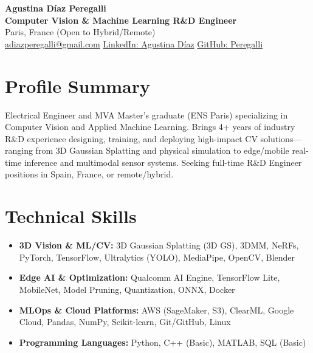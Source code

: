 \documentclass[10pt, a4paper]{article}
\begin{document}
\begin{center}
    {\LARGE \textbf{Agustina Díaz Peregalli}} \\ \vspace{2pt}
    {\large \textbf{Computer Vision \& Machine Learning R\&D Engineer}} \\ \vspace{2pt}
    Paris, France \textbar{} (Open to Hybrid/Remote) \\ \vspace{2pt}
    \href{mailto:adiazperegalli@gmail.com}{adiazperegalli@gmail.com} \textbar{} 
    \href{https://www.linkedin.com/in/agustina-diaz-peregalli/}{LinkedIn: Agustina Díaz} \textbar{} 
    \href{https://github.com/Peregalli}{GitHub: Peregalli}
\end{center}

\section{Profile Summary}
Electrical Engineer and MVA Master's graduate (ENS Paris) specializing in Computer Vision and Applied Machine Learning. Brings 4+ years of industry R\&D experience designing, training, and deploying high-impact CV solutions—ranging from 3D Gaussian Splatting and physical simulation to edge/mobile real-time inference and multimodal sensor systems. Seeking full-time R\&D Engineer positions in Spain, France, or remote/hybrid.

\section{Technical Skills}
\begin{itemize}
    \item \textbf{3D Vision \& ML/CV:} 3D Gaussian Splatting (3D GS), 3DMM, NeRFs, PyTorch, TensorFlow, Ultralytics (YOLO), MediaPipe, OpenCV, Blender
    \item \textbf{Edge AI \& Optimization:} Qualcomm AI Engine, TensorFlow Lite, MobileNet, Model Pruning, Quantization, ONNX, Docker
    \item \textbf{MLOps \& Cloud Platforms:} AWS (SageMaker, S3), ClearML, Google Cloud, Pandas, NumPy, Scikit-learn, Git/GitHub, Linux
    \item \textbf{Programming Languages:} Python, C++ (Basic), MATLAB, SQL (Basic)
\end{itemize}

\end{document}
